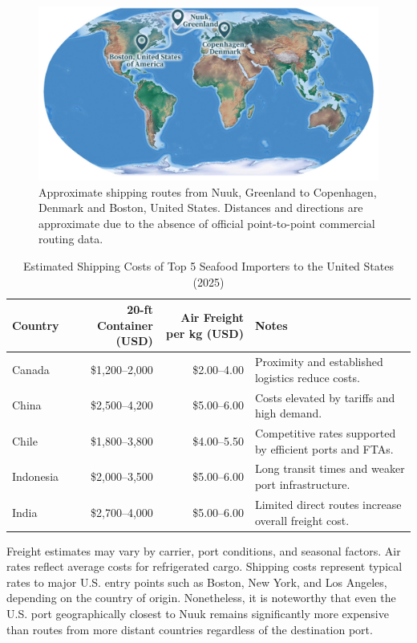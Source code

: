 \documentclass{adonis}
\begin{document}
    \begin{figure}[H]
        \centering
        \includegraphics[width=.75\linewidth]{trade-routes.png}
        \caption{Approximate shipping routes from Nuuk, Greenland to Copenhagen, Denmark and Boston, United States. Distances and directions are approximate due to the absence of official point-to-point commercial routing data.}
        \label{fig:trade-routes}
    \end{figure}

    \renewcommand{\arraystretch}{0.95}
\begin{table}[H]
\centering
\small
\begin{threeparttable}
\caption{Estimated Shipping Costs of Top 5 Seafood Importers to the United States (2025) \citep{freightos2025canada, dantful2025china, icontainers2025chile, freightos2025indonesia, freightos2025india}}
\label{tab:seafood-shipping-costs}
\begin{tabular}{@{}l@{\hskip 6pt}r@{\hskip 6pt}r@{\hskip 6pt}p{5.2cm}@{}}
\toprule
\textbf{Country} & \textbf{20-ft Container (USD)} & \textbf{Air Freight per kg (USD)} & \textbf{Notes} \\
\midrule
Canada     & \$1,200–2,000 & \$2.00–4.00 & Proximity and established logistics reduce costs. \\
China      & \$2,500–4,200 & \$5.00–6.00 & Costs elevated by tariffs and high demand. \\
Chile      & \$1,800–3,800 & \$4.00–5.50 & Competitive rates supported by efficient ports and FTAs. \\
Indonesia  & \$2,000–3,500 & \$5.00–6.00 & Long transit times and weaker port infrastructure. \\
India      & \$2,700–4,000 & \$5.00–6.00 & Limited direct routes increase overall freight cost. \\
\bottomrule
\end{tabular}
\begin{tablenotes}
\footnotesize
\item Freight estimates may vary by carrier, port conditions, and seasonal factors. Air rates reflect average costs for refrigerated cargo. Shipping costs represent typical rates to major U.S. entry points such as Boston, New York, and Los Angeles, depending on the country of origin. Nonetheless, it is noteworthy that even the U.S. port geographically closest to Nuuk remains significantly more expensive than routes from more distant countries regardless of the destination port.
\end{tablenotes}
\end{threeparttable}
\end{table}
\end{document}
